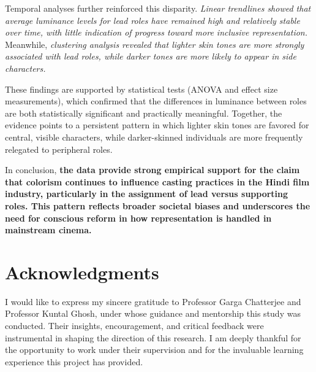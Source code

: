 \documentclass{article}
\begin{document}
Temporal analyses further reinforced this disparity. \textit{Linear trendlines showed that average luminance levels for lead roles have remained high and relatively stable over time, with little indication of progress toward more inclusive representation.} Meanwhile, \textit{clustering analysis revealed that lighter skin tones are more strongly associated with lead roles, while darker tones are more likely to appear in side characters.}

These findings are supported by statistical tests (ANOVA and effect size measurements), which confirmed that the differences in luminance between roles are both statistically significant and practically meaningful. Together, the evidence points to a persistent pattern in which lighter skin tones are favored for central, visible characters, while darker-skinned individuals are more frequently relegated to peripheral roles.

In conclusion, \textbf{the data provide strong empirical support for the claim that colorism continues to influence casting practices in the Hindi film industry, particularly in the assignment of lead versus supporting roles. This pattern reflects broader societal biases and underscores the need for conscious reform in how representation is handled in mainstream cinema.}

\section*{Acknowledgments}
I would like to express my sincere gratitude to Professor Garga Chatterjee and Professor Kuntal Ghosh, under whose guidance and mentorship this study was conducted. Their insights, encouragement, and critical feedback were instrumental in shaping the direction of this research. I am deeply thankful for the opportunity to work under their supervision and for the invaluable learning experience this project has provided.

  
  
\end{document}
